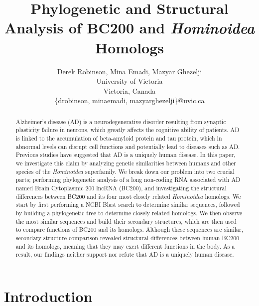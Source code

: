 \documentclass[conference, 11pt]{IEEEtran}
\begin{document}


\title{Phylogenetic and Structural Analysis of BC200 and \emph{Hominoidea} Homologs}

\author{Derek Robinson, Mina Emadi, Mazyar Ghezelji\\
University of Victoria\\
Victoria, Canada \\
\{drobinson, minaemadi, mazyarghezelji\}@uvic.ca}

\maketitle

\begin{abstract}
Alzheimer’s disease (AD) is a neurodegenerative disorder resulting from synaptic plasticity failure in neurons, which greatly affects the cognitive ability of patients. 
AD is linked to the accumulation of beta-amyloid protein and tau protein, which in abnormal levels can disrupt cell functions and potentially lead to diseases such as AD. 
Previous studies have suggested that AD is a uniquely human disease. 
In this paper, we investigate this claim by analyzing genetic similarities between humans and other species of the \emph{Hominoidea} superfamily.
We break down our problem into two crucial parts; performing phylogenetic analysis of a long non-coding RNA associated with AD named Brain Cytoplasmic 200 lncRNA (BC200), and investigating the structural differences between BC200 and its four most closely related \emph{Hominoidea} homologs. 
We start by first performing a NCBI Blast search to determine similar sequences, followed by building a phylogenetic tree to determine closely related homologs.
We then observe the most similar sequences and build their secondary structures, which are then used to compare functions of BC200 and its homologs.
Although these sequences are similar, secondary structure comparison revealed structural differences between human BC200 and its homologs, meaning that they may exert different functions in the body.
As a result, our findings neither support nor refute that AD is a uniquely human disease.
\end{abstract}

\section{Introduction}\label{sec:intro}
\end{document}

